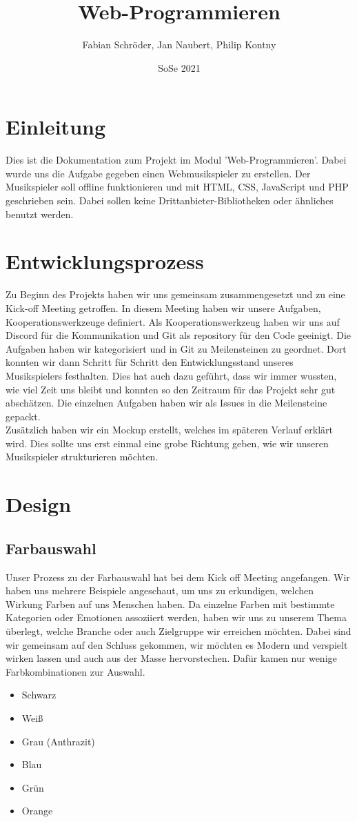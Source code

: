 \documentclass{article}
\title{Web-Programmieren}
\author{Fabian Schröder, Jan Naubert, Philip Kontny}
\date{SoSe 2021}
\begin{document}
\maketitle
\newpage
\tableofcontents
\newpage

\section{Einleitung}
Dies ist die Dokumentation zum Projekt im Modul 'Web-Programmieren'. Dabei wurde uns die Aufgabe gegeben einen Webmusikspieler zu erstellen. Der Musikspieler soll offline funktionieren und mit HTML, CSS, JavaScript und PHP geschrieben sein. Dabei sollen keine Drittanbieter-Bibliotheken oder ähnliches benutzt werden.

\section{Entwicklungsprozess}
Zu Beginn des Projekts haben wir uns gemeinsam zusammengesetzt und zu eine Kick-off Meeting getroffen. In diesem Meeting haben wir unsere Aufgaben, Kooperationswerkzeuge definiert. Als Kooperationswerkzeug haben wir uns auf Discord für die Kommunikation und Git als repository für den Code geeinigt. Die Aufgaben haben wir kategorisiert und in Git zu Meilensteinen zu geordnet. Dort konnten wir dann Schritt für Schritt den Entwicklungsstand unseres Musikspielers festhalten. Dies hat auch dazu geführt, dass wir immer wussten, wie viel Zeit uns bleibt und konnten so den Zeitraum für das Projekt sehr gut abschätzen. Die einzelnen Aufgaben haben wir als Issues in die Meilensteine gepackt.\\
Zusätzlich haben wir ein Mockup erstellt, welches im späteren Verlauf erklärt wird. Dies sollte uns erst einmal eine grobe Richtung geben, wie wir unseren Musikspieler strukturieren möchten.

\newpage
\section{Design}
\subsection{Farbauswahl}
Unser Prozess zu der Farbauswahl hat bei dem Kick off Meeting angefangen. Wir haben uns mehrere Beispiele angeschaut, um uns zu erkundigen, welchen Wirkung Farben auf uns Menschen haben. Da einzelne Farben mit bestimmte Kategorien oder Emotionen assoziiert werden, haben wir uns zu unserem Thema überlegt, welche Branche oder auch Zielgruppe wir erreichen möchten. Dabei sind wir gemeinsam auf den Schluss gekommen, wir möchten es Modern und verspielt wirken lassen und auch aus der Masse hervorstechen. Dafür kamen nur wenige Farbkombinationen zur Auswahl. 
\begin{itemize}
    \item Schwarz
    \item Weiß
    \item Grau (Anthrazit)
    \item Blau
    \item Grün
    \item Orange
\end{itemize}
\end{document}
